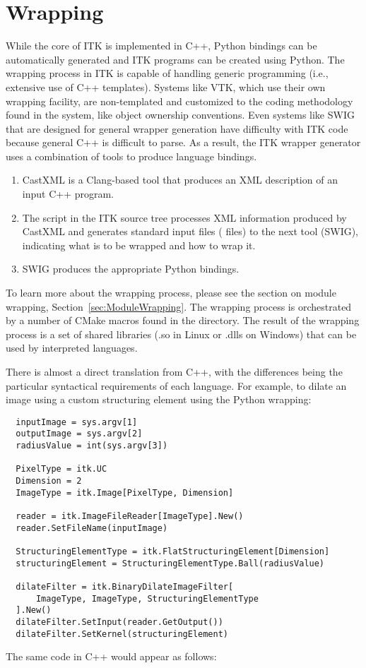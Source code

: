 \section{Wrapping}
\label{sec:Wrapping}


While the core of ITK is implemented in C++, Python bindings can be
automatically generated and ITK programs can be created using Python.  The
wrapping process in ITK is capable of handling generic programming (i.e.,
extensive use of C++ templates). Systems like VTK, which use their own
wrapping facility, are non-templated and customized to the coding methodology
found in the system, like object ownership conventions. Even systems
like SWIG that are designed for general wrapper generation have difficulty
with ITK code because general C++ is difficult to parse. As a result, the ITK
wrapper generator uses a combination of tools to produce language bindings.

\begin{enumerate}
  \item CastXML is a Clang-based tool that
    produces an XML description of an input C++ program.
  \item The  script in the ITK source tree processes XML
    information produced by CastXML and generates standard input files
    ( files) to the next tool (SWIG), indicating what is to be wrapped
    and how to wrap it.
  \item SWIG produces the appropriate Python bindings.
\end{enumerate}

To learn more about the wrapping process, please see the section on module
wrapping, Section~\ref{sec:ModuleWrapping}.  The wrapping process is orchestrated by a
number of CMake macros found in the  directory. The result of
the wrapping process is a set of shared libraries (.so in Linux or .dlls on
Windows) that can be used by interpreted languages.

There is almost a direct translation from C++, with the differences being the
particular syntactical requirements of each language. For example, to dilate an
image using a custom structuring element using the Python wrapping:

\small
\begin{verbatim}
  inputImage = sys.argv[1]
  outputImage = sys.argv[2]
  radiusValue = int(sys.argv[3])

  PixelType = itk.UC
  Dimension = 2
  ImageType = itk.Image[PixelType, Dimension]

  reader = itk.ImageFileReader[ImageType].New()
  reader.SetFileName(inputImage)

  StructuringElementType = itk.FlatStructuringElement[Dimension]
  structuringElement = StructuringElementType.Ball(radiusValue)

  dilateFilter = itk.BinaryDilateImageFilter[
      ImageType, ImageType, StructuringElementType
  ].New()
  dilateFilter.SetInput(reader.GetOutput())
  dilateFilter.SetKernel(structuringElement)
\end{verbatim}
\normalsize
The same code in C++ would appear as follows:

